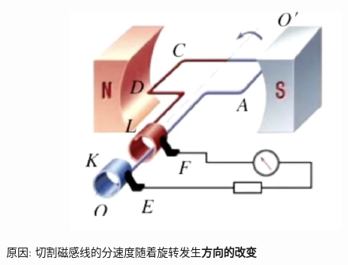\documentclass{article}
\begin{document}
\begin{enumerate}
\begin{enumerate}[label=(\arabic*)]
\begin{figure}[h]
\begin{subfigure}{0.4\textwidth}
                    \includegraphics[width=\textwidth,keepaspectratio]{pictures/1.1-4.png}
                    \caption{} 
                \end{subfigure}
            \end{figure}
            原因: \quad 切割磁感线的分速度随着旋转发生\textbf{方向的改变}
        \end{enumerate}

    \end{enumerate}
\end{document}
